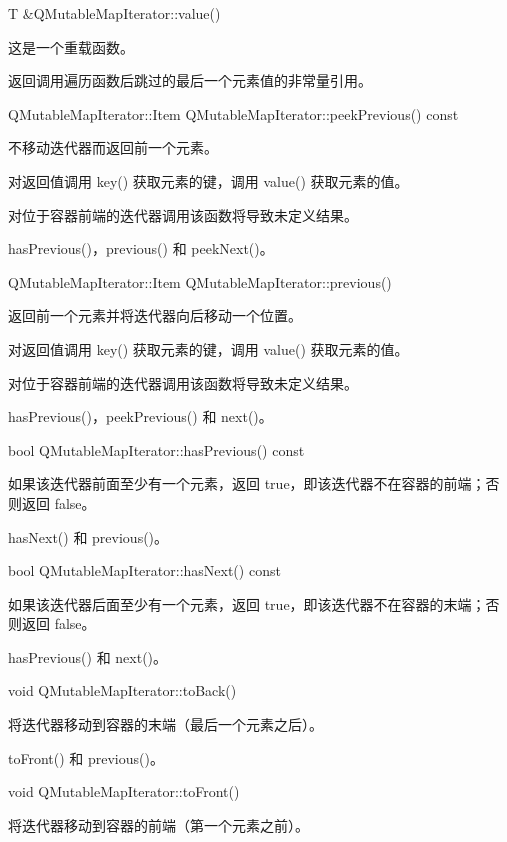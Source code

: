 T \&QMutableMapIterator::value()

这是一个重载函数。

返回调用遍历函数后跳过的最后一个元素值的非常量引用。

QMutableMapIterator::Item QMutableMapIterator::peekPrevious() const

不移动迭代器而返回前一个元素。

对返回值调用 key() 获取元素的键，调用 value() 获取元素的值。

对位于容器前端的迭代器调用该函数将导致未定义结果。

\begin{seeAlso}
hasPrevious()，previous() 和 peekNext()。
\end{seeAlso}

QMutableMapIterator::Item QMutableMapIterator::previous()

返回前一个元素并将迭代器向后移动一个位置。

对返回值调用 key() 获取元素的键，调用 value() 获取元素的值。

对位于容器前端的迭代器调用该函数将导致未定义结果。

\begin{seeAlso}
hasPrevious()，peekPrevious() 和 next()。
\end{seeAlso}

bool QMutableMapIterator::hasPrevious() const

如果该迭代器前面至少有一个元素，返回 true，即该迭代器不在容器的前端；否则返回 false。

\begin{seeAlso}
hasNext() 和 previous()。
\end{seeAlso}

bool QMutableMapIterator::hasNext() const

如果该迭代器后面至少有一个元素，返回 true，即该迭代器不在容器的末端；否则返回 false。

\begin{seeAlso}
hasPrevious() 和 next()。
\end{seeAlso}

void QMutableMapIterator::toBack()

将迭代器移动到容器的末端（最后一个元素之后）。

\begin{seeAlso}
toFront() 和 previous()。
\end{seeAlso}

void QMutableMapIterator::toFront()

将迭代器移动到容器的前端（第一个元素之前）。

